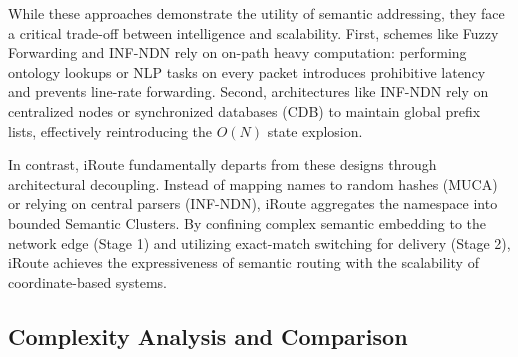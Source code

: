 \documentclass[conference]{IEEEtran}
\newcommand{\sysname}{iRoute}
\begin{document}
While these approaches demonstrate the utility of semantic addressing, they face a critical trade-off between intelligence and scalability.
First, schemes like Fuzzy Forwarding and INF-NDN rely on on-path heavy computation: performing ontology lookups or NLP tasks on every packet introduces prohibitive latency and prevents line-rate forwarding.
Second, architectures like INF-NDN rely on centralized nodes or synchronized databases (CDB) to maintain global prefix lists, effectively reintroducing the $O(N)$ state explosion.

In contrast, \sysname{} fundamentally departs from these designs through architectural decoupling. Instead of mapping names to random hashes (MUCA) or relying on central parsers (INF-NDN), \sysname{} aggregates the namespace into bounded Semantic Clusters. By confining complex semantic embedding to the network edge (Stage 1) and utilizing exact-match switching for delivery (Stage 2), \sysname{} achieves the expressiveness of semantic routing with the scalability of coordinate-based systems.

\subsection{Complexity Analysis and Comparison}
\label{sec:related_complexity}

\end{document}
